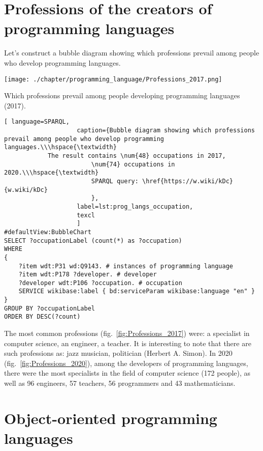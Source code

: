 \section{Professions of the creators of programming languages}
Let's construct a bubble diagram showing which professions prevail among people who develop programming languages.

\begin{marginfigure}[3cm]
	\texttt{[image: ./chapter/programming\_language/Professions\_2017.png]}
	\caption{Which professions prevail among people developing programming languages (2017).}
	\label{fig:Professions_2017}
\end{marginfigure}
\begin{lstlisting}[ language=SPARQL, 
                    caption={Bubble diagram showing which professions prevail among people who develop programming languages.\\\hspace{\textwidth}
			The result contains \num{48} occupations in 2017, 
                        \num{74} occupations in 2020.\\\hspace{\textwidth}
                        SPARQL query: \href{https://w.wiki/kDc}{w.wiki/kDc}
                        },
                    label=lst:prog_langs_occupation,
                    texcl 
                    ]
#defaultView:BubbleChart
SELECT ?occupationLabel (count(*) as ?occupation)
WHERE
{
    ?item wdt:P31 wd:Q9143. # instances of programming language 
    ?item wdt:P178 ?developer. # developer
    ?developer wdt:P106 ?occupation. # occupation
    SERVICE wikibase:label { bd:serviceParam wikibase:language "en" }
}
GROUP BY ?occupationLabel 
ORDER BY DESC(?count)
\end{lstlisting}%

The most common professions (fig.~\ref{fig:Professions_2017}) were: a specialist in computer science, an engineer, a teacher. It is interesting to note that there are such professions as: jazz musician, politician (Herbert A. Simon). In 2020 (fig.~\ref{fig:Professions_2020}), among the developers of programming languages, there were the most specialists in the field of computer science (172 people), as well as 96 engineers, 57 teachers, 56 programmers and 43 mathematicians.

\section{Object-oriented programming languages}

